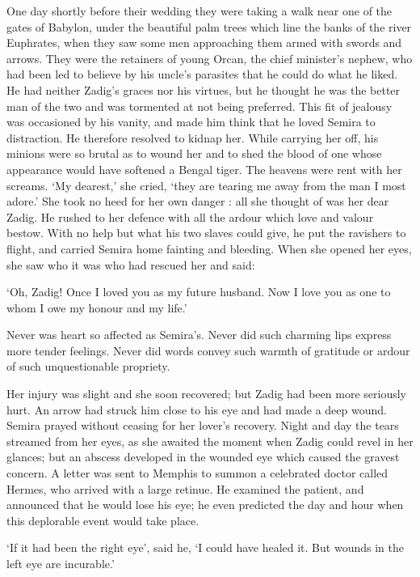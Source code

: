 \documentclass{article}
\begin{document}
\begin{center}
One day shortly before their wedding they were taking a walk near one of the gates 
of Babylon, under the beautiful palm trees which line the banks of the river Euphrates, 
when they saw some men approaching them armed with swords and arrows. They were 
the retainers of young Orcan, the chief minister's nephew, who had been led to 
believe by his uncle's parasites that he could do what he liked. He had neither 
Zadig's graces nor his virtues, but he thought he was the better man of the two 
and was tormented at not being preferred. This fit of jealousy was occasioned by 
his vanity, and made him think that he loved Semira to distraction. He therefore 
resolved to kidnap her. While carrying her off, his minions were so brutal as to 
wound her and to shed the blood of one whose appearance would have softened a Bengal 
tiger. The heavens were rent with her screams. `My dearest,' she cried, `they are 
tearing me away from the man I most adore.' She took no heed for her own danger 
: all she thought of was her dear Zadig. He rushed to her defence with all the 
ardour which love and valour bestow. With no help but what his two slaves could 
give, he put the ravishers to flight, and carried Semira home fainting and bleeding. 
When she opened her eyes, she saw who it was who had rescued her and said: 

`Oh, Zadig! Once I loved you as my future husband. Now I love you as one to whom 
I owe my honour and my life.' 

Never was heart so affected as Semira's. Never did such charming lips express more 
tender feelings. Never did words convey such warmth of gratitude or ardour of such 
unquestionable propriety. 

Her injury was slight and she soon recovered; but Zadig had been more seriously 
hurt. An arrow had struck him close to his eye and had made a deep wound. Semira 
prayed without ceasing for her lover's recovery. Night and day the tears streamed 
from her eyes, as she awaited the moment when Zadig could revel in her glances; 
but an abscess developed in the wounded eye which caused the gravest concern. A 
letter was sent to Memphis to summon a celebrated doctor called Hermes, who arrived 
with a large retinue. He examined the patient, and announced that he would lose 
his eye; he even predicted the day and hour when this deplorable event would take 
place. 

`If it had been the right eye', said he, `I could have healed it. But wounds in 
the left eye are incurable.' 


\end{center}
\end{document}
